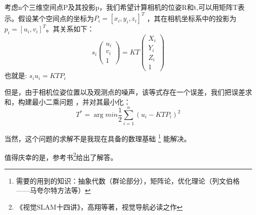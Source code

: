 考虑n个三维空间点P及其投影p，我们希望计算相机的位姿R和t,可以用矩阵T表示。假设某个空间点的坐标为$P_i = [x_i,y_i,z_i]^T$
，其在相机坐标系中的投影为$p_i = [u_i,v_i]^T$。其关系如下：
\begin{equation}
    s_i \begin{pmatrix} u_i \\ v_i \\ 1 \end{pmatrix} = K T \begin{pmatrix}
    X_i \\ Y_i \\ Z_i \\ 1
    \end{pmatrix}
\end{equation}
也就是: 
$s_i u_i = K T P_i$

但是，由于相机位姿位置以及观测点的噪声，该等式存在一个误差，我们把误差求和，构建最小二乘问题
，并对其最小化：
\begin{equation}
    T^* = \arg min  \frac{1}{2} \sum_{i=1}^{n} \left( u_i - K T P_i \right)^2
\end{equation}

当然，这个问题的求解不是我现在具备的数理基础
\footnote{需要的用到的知识：抽象代数（群论部分），矩阵论，优化理论（列文伯格——马夸尔特方法等）}
能解决。

值得庆幸的是，参考书\footnote{《视觉SLAM十四讲》，高翔等著，视觉导航必读之作}给出了解答。


